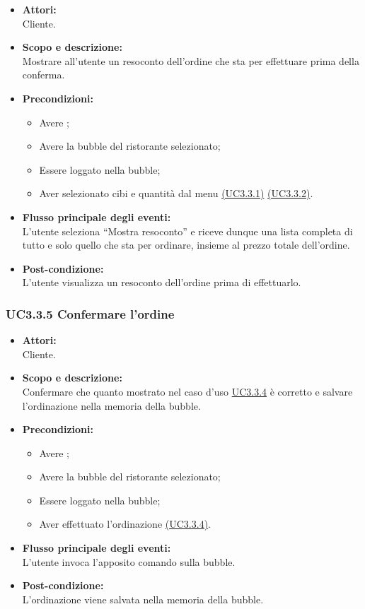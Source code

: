 \begin{itemize}
	\item \textbf{Attori:}
	\\Cliente.
	\item \textbf{Scopo e descrizione:} 
	\\Mostrare all’utente un resoconto dell’ordine che sta per effettuare prima della conferma.
	\item \textbf{Precondizioni:}
	\begin{itemize}
		\item Avere ;
		\item Avere la bubble del ristorante selezionato;
		\item Essere loggato nella bubble;
		\item Aver selezionato cibi e quantità dal menu \hyperref[UC3.3.1]{(UC3.3.1)} \hyperref[UC3.3.2]{(UC3.3.2)}.
	\end{itemize}
	\item \textbf{Flusso principale degli eventi:}
	\\L’utente seleziona “Mostra resoconto” e riceve dunque una lista completa di tutto e solo quello che sta per ordinare, insieme al prezzo totale dell’ordine.
	\item \textbf{Post-condizione:}
	\\L’utente visualizza un resoconto dell’ordine prima di effettuarlo.
\end{itemize}

\subsubsection{UC3.3.5 Confermare l’ordine} \label{UC3.3.5}

\begin{itemize}
	\item \textbf{Attori:}
	\\Cliente.
	\item \textbf{Scopo e descrizione:} 
	\\Confermare che quanto mostrato nel caso d’uso \hyperref[UC3.3.4]{UC3.3.4} è corretto e salvare l'ordinazione nella memoria della bubble.
	\item \textbf{Precondizioni:}
	\begin{itemize}
		\item Avere ;
		\item Avere la bubble del ristorante selezionato;
		\item Essere loggato nella bubble;
		\item Aver effettuato l’ordinazione \hyperref[UC3.3.4]{(UC3.3.4)}.
	\end{itemize}
	\item \textbf{Flusso principale degli eventi:}
	\\L'utente invoca l'apposito comando sulla bubble.
	\item \textbf{Post-condizione:}
	\\L’ordinazione viene salvata nella memoria della bubble.
\end{itemize}

